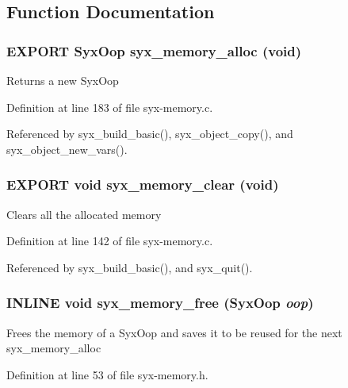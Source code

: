 \subsection{Function Documentation}
\hypertarget{syx-memory_8h_54ca482cf9491f7baea6c2ad0f26ae66}{
\subsubsection{\setlength{\rightskip}{0pt plus 5cm}EXPORT {\bf SyxOop} syx\_\-memory\_\-alloc (void)}}
\label{syx-memory_8h_54ca482cf9491f7baea6c2ad0f26ae66}


Returns a new SyxOop 

Definition at line 183 of file syx-memory.c.

Referenced by syx\_\-build\_\-basic(), syx\_\-object\_\-copy(), and syx\_\-object\_\-new\_\-vars().\hypertarget{syx-memory_8h_cbf4870c020690e41fd38b02adfdd62e}{
\subsubsection{\setlength{\rightskip}{0pt plus 5cm}EXPORT void syx\_\-memory\_\-clear (void)}}
\label{syx-memory_8h_cbf4870c020690e41fd38b02adfdd62e}


Clears all the allocated memory 

Definition at line 142 of file syx-memory.c.

Referenced by syx\_\-build\_\-basic(), and syx\_\-quit().\hypertarget{syx-memory_8h_e529b61f2ebc2e51211c4bac3c810c69}{
\subsubsection{\setlength{\rightskip}{0pt plus 5cm}INLINE void syx\_\-memory\_\-free ({\bf SyxOop} {\em oop})}}
\label{syx-memory_8h_e529b61f2ebc2e51211c4bac3c810c69}


Frees the memory of a SyxOop and saves it to be reused for the next syx\_\-memory\_\-alloc 

Definition at line 53 of file syx-memory.h.

